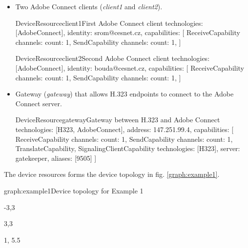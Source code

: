 \begin{itemize}
\item Two Adobe Connect clients (\emph{client1} and \emph{client2}).

\begin{ResourceExample}{DeviceResource}{client1}{First Adobe Connect client}
technologies: [AdobeConnect], 
identity: srom@cesnet.cz,
capabilities: [
  ReceiveCapability {channels: {count: 1}},
  SendCapability {channels: {count: 1}},
]
\end{ResourceExample}

\begin{ResourceExample}{DeviceResource}{client2}{Second Adobe Connect client}
technologies: [AdobeConnect], 
identity: bouda@cesnet.cz,
capabilities: [
  ReceiveCapability {channels: {count: 1}},
  SendCapability {channels: {count: 1}},
]
\end{ResourceExample}

\item Gateway (\emph{gateway}) that allows H.323 endpoints to connect to
  the Adobe Connect server.
    
\begin{ResourceExample}{DeviceResource}{gateway}{Gateway between H.323 and Adobe Connect}
technologies: [H323, AdobeConnect], 
address: 147.251.99.4,
capabilities: [
  ReceiveCapability {channels: {count: 1}},
  SendCapability {channels: {count: 1}},
  TranslateCapability,
  SignalingClientCapability {technologies: [H323], server: gatekeeper, 
     aliases: [9505]}
]
\end{ResourceExample}

\end{itemize}

The device resources forms the device topology in fig. \ref{graph:example1}. 

\begin{Graph}{graph:example1}{Device topology for Example 1}  
  \begin{SubGraph}{-3,3}{}
  \end{SubGraph}
  
  \begin{SubGraph}{3,3}{}
  \end{SubGraph}
  
  
  \begin{GraphLegend}{1, 5.5}
  \end{GraphLegend}
\end{Graph}

